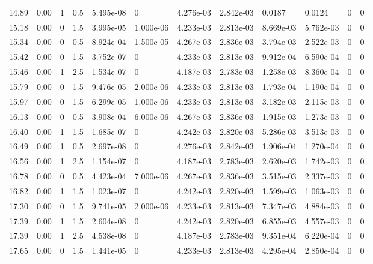 \documentclass[preview]{standalone}
\begin{document}
{{{\begin{tabular}{L{1.2cm}C{1.2cm} C{0.3cm}C{0.5cm} C{1.4cm}C{1.4cm} C{1.4cm}C{1.4cm} C{1.6cm}C{1.6cm} C{1.6cm}C{1.6cm}}
  14.89  &  0.00  & 1     & 0.5 &  5.495e-08  & 0  &  4.276e-03&   2.842e-03& 0.0187 & 0.0124   &  0 & 0  \\ 
  15.18  &  0.00  & 0     & 1.5 &  3.995e-05  & 1.000e-06  &  4.233e-03&   2.813e-03& 8.669e-03 & 5.762e-03   &  0 & 0  \\ 
  15.34  &  0.00  & 0     & 0.5 &  8.924e-04  & 1.500e-05  &  4.267e-03&   2.836e-03& 3.794e-03 & 2.522e-03   &  0 & 0  \\ 
  15.42  &  0.00  & 0     & 1.5 &  3.752e-07  & 0  &  4.233e-03&   2.813e-03& 9.912e-04 & 6.590e-04   &  0 & 0  \\ 
  15.46  &  0.00  & 1     & 2.5 &  1.534e-07  & 0  &  4.187e-03&   2.783e-03& 1.258e-03 & 8.360e-04   &  0 & 0  \\ 
  15.79  &  0.00  & 0     & 1.5 &  9.476e-05  & 2.000e-06  &  4.233e-03&   2.813e-03& 1.793e-04 & 1.190e-04   &  0 & 0  \\ 
  15.97  &  0.00  & 0     & 1.5 &  6.299e-05  & 1.000e-06  &  4.233e-03&   2.813e-03& 3.182e-03 & 2.115e-03   &  0 & 0  \\ 
  16.13  &  0.00  & 0     & 0.5 &  3.908e-04  & 6.000e-06  &  4.267e-03&   2.836e-03& 1.915e-03 & 1.273e-03   &  0 & 0  \\ 
  16.40  &  0.00  & 1     & 1.5 &  1.685e-07  & 0  &  4.242e-03&   2.820e-03& 5.286e-03 & 3.513e-03   &  0 & 0  \\ 
  16.49  &  0.00  & 1     & 0.5 &  2.697e-08  & 0  &  4.276e-03&   2.842e-03& 1.906e-04 & 1.270e-04   &  0 & 0  \\ 
  16.56  &  0.00  & 1     & 2.5 &  1.154e-07  & 0  &  4.187e-03&   2.783e-03& 2.620e-03 & 1.742e-03   &  0 & 0  \\ 
  16.78  &  0.00  & 0     & 0.5 &  4.423e-04  & 7.000e-06  &  4.267e-03&   2.836e-03& 3.515e-03 & 2.337e-03   &  0 & 0  \\ 
  16.82  &  0.00  & 1     & 1.5 &  1.023e-07  & 0  &  4.242e-03&   2.820e-03& 1.599e-03 & 1.063e-03   &  0 & 0  \\ 
  17.30  &  0.00  & 0     & 1.5 &  9.741e-05  & 2.000e-06  &  4.233e-03&   2.813e-03& 7.347e-03 & 4.884e-03   &  0 & 0  \\ 
  17.39  &  0.00  & 1     & 1.5 &  2.604e-08  & 0  &  4.242e-03&   2.820e-03& 6.855e-03 & 4.557e-03   &  0 & 0  \\ 
  17.39  &  0.00  & 1     & 2.5 &  4.538e-08  & 0  &  4.187e-03&   2.783e-03& 9.351e-04 & 6.220e-04   &  0 & 0  \\ 
  17.65  &  0.00  & 0     & 1.5 &  1.441e-05  & 0  &  4.233e-03&   2.813e-03& 4.295e-04 & 2.850e-04   &  0 & 0  \\ 

\end{tabular}}}}
\end{document}
